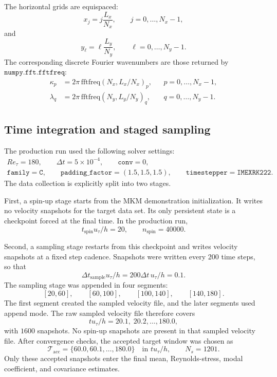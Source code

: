 \documentclass[11pt]{article}
\begin{document}
The horizontal grids are equispaced:
\begin{equation}
  x_j = j\frac{L_x}{N_x},\qquad j=0,\ldots,N_x-1,
  \label{eq:x_grid}
\end{equation}
and
\begin{equation}
  y_\ell = \ell\frac{L_y}{N_y},\qquad \ell=0,\ldots,N_y-1.
  \label{eq:y_grid}
\end{equation}
The corresponding discrete Fourier wavenumbers are those returned by
\(\texttt{numpy.fft.fftfreq}\):
\begin{align}
  \kappa_p &= 2\pi\,\mathrm{fftfreq}(N_x,L_x/N_x)_p,
  &&p=0,\ldots,N_x-1, \label{eq:kappa_grid}\\
  \lambda_q &= 2\pi\,\mathrm{fftfreq}(N_y,L_y/N_y)_q,
  &&q=0,\ldots,N_y-1. \label{eq:lambda_grid}
\end{align}

\subsection{Time integration and staged sampling}

The production run used the following solver settings:
\[
\begin{gathered}
  Re_{\tau}=180,\qquad \Delta t=5\times 10^{-4},\qquad
  \texttt{conv}=0,\\
  \texttt{family}=\texttt{C},\qquad
  \texttt{padding\_factor}=(1.5,1.5,1.5),\qquad
  \texttt{timestepper}=\texttt{IMEXRK222}.
\end{gathered}
\]
The data collection is explicitly split into two stages.

First, a spin-up stage starts from the MKM demonstration initialization. It
writes no velocity snapshots for the target data set. Its only persistent
state is a checkpoint forced at the final time. In the production run,
\[
  t_{\mathrm{spin}}u_{\tau}/h = 20,\qquad n_{\mathrm{spin}}=40000.
\]

Second, a sampling stage restarts from this checkpoint and writes velocity
snapshots at a fixed step cadence. Snapshots were written every
200 time steps, so that
\[
  \Delta t_{\mathrm{sample}} u_{\tau}/h = 200\Delta t\,u_{\tau}/h = 0.1.
\]
The sampling stage was appended in four segments:
\[
  [20,60],\qquad [60,100],\qquad [100,140],\qquad [140,180].
\]
The first segment created the sampled velocity file, and the later segments
used append mode. The raw sampled velocity file therefore covers
\[
  t u_{\tau}/h=20.1,\;20.2,\ldots,180.0,
\]
with \(1600\) snapshots. No spin-up snapshots are present in that sampled
velocity file. After convergence checks, the accepted target window was chosen
as
\begin{equation}
  \mathcal{T}_{\mathrm{acc}} = \{60.0,60.1,\ldots,180.0\}
  \quad\text{in }t u_{\tau}/h,
  \qquad N_s=1201.
  \label{eq:accepted_sample_times}
\end{equation}
Only these accepted snapshots enter the final mean, Reynolds-stress, modal
coefficient, and covariance estimates.
\end{document}
